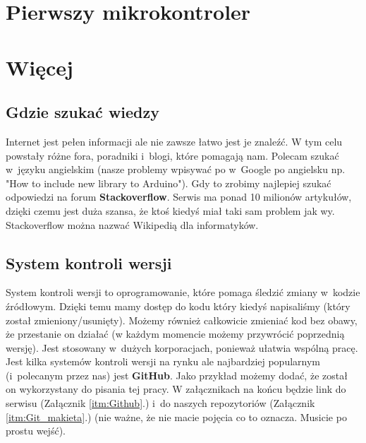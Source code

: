 \documentclass[a4paper,12pt, twoside]{article}
\let\oldsection\section		%
\renewcommand\section{\clearpage\oldsection}%
\begin{document}
\section{Pierwszy mikrokontroler}
		

\section {Więcej}

\subsection {Gdzie szukać wiedzy}
Internet jest pełen informacji ale nie zawsze łatwo jest je znaleźć. W tym celu powstały różne fora, poradniki i~blogi, które pomagają nam. Polecam szukać w~języku angielskim (nasze problemy wpisywać po w~Google po angielsku np. "How to include new library to Arduino"). Gdy to zrobimy najlepiej szukać odpowiedzi na forum \textbf{Stackoverflow}. Serwis ma ponad 10 milionów artykułów, dzięki czemu jest duża szansa, że ktoś kiedyś miał taki sam problem jak wy. Stackoverflow można nazwać Wikipedią dla informatyków. 
\subsection{System kontroli wersji}
System kontroli wersji to oprogramowanie, które pomaga śledzić zmiany w~kodzie źródłowym.
Dzięki temu mamy dostęp do kodu który kiedyś napisaliśmy (który został zmieniony/usunięty). Możemy również całkowicie zmieniać kod bez obawy, że przestanie on działać (w każdym momencie możemy przywrócić poprzednią wersję). Jest stosowany w~dużych korporacjach, ponieważ ułatwia wspólną pracę. Jest kilka systemów kontroli wersji na rynku ale najbardziej popularnym (i~polecanym przez nas) jest \textbf{GitHub}. Jako przykład możemy dodać, że został on wykorzystany do pisania tej pracy. W załącznikach na końcu będzie link do serwisu (Załącznik \ref{itm:Github}.) i~do naszych repozytoriów (Załącznik \ref{itm:Git_makieta}.) (nie ważne, że nie macie pojęcia co to oznacza. Musicie po prostu wejść).
\cite{SKW-Wiki, Git-Wiki}
\end{document}
